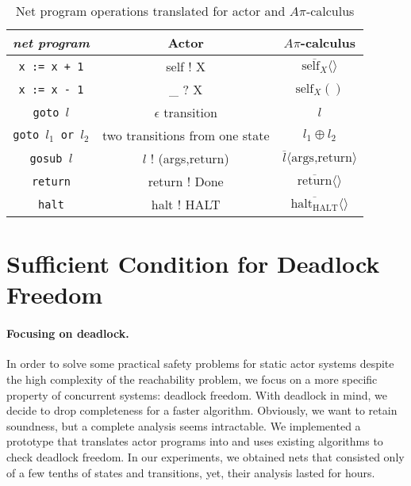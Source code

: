 \documentclass[a4paper]{report}
\numberwithin{algorithm}{chapter}
\begin{document}
\begin{table}
\caption{Net program operations translated for actor and $A\pi$-calculus}
\label{tableOp}
\centering
\begin{tabular}{|c|c|c|}
\hline
\emph{net program} & Actor & $A\pi$-calculus \\
\hline
\hline
\texttt{x := x + 1}             & self ! X                          & $\overline{\text{self}_X} \langle \rangle$  \\
\texttt{x := x - 1}             & \_ ? X                            & $\text{self}_X () $\\
\texttt{goto $l$}               & $\epsilon$ transition             & $l$ \\
\texttt{goto $l_1$ or $l_2$}    & two transitions from one state    & $l_1 \oplus l_2$ \\
\texttt{gosub $l$}              & $l$ ! (args,return)               & $\overline l \langle \text{args,return} \rangle$ \\
\texttt{return}                 & return ! Done                     & $\overline{\text{return}} \langle \rangle$ \\
\texttt{halt}                   & halt ! HALT                       & $\overline{\text{halt}_{\text{HALT}}} \langle \rangle$\\
\hline
\end{tabular}
\end{table}

\section{Sufficient Condition for Deadlock Freedom}

\paragraph{Focusing on deadlock.}
In order to solve some practical safety problems for static actor systems despite the high complexity of the reachability problem, we focus on a more specific property of concurrent systems: deadlock freedom.
With deadlock in mind, we decide to drop completeness for a faster algorithm.
Obviously, we want to retain soundness, but a complete analysis seems intractable.
We implemented a prototype that translates \scala{} actor programs into \pns{} and uses existing \pn{} algorithms to check deadlock freedom.
In our experiments, we obtained nets that consisted only of a few tenths of states and transitions, yet, their analysis lasted for hours.
\end{document}
